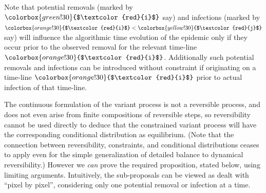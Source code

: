 \documentclass[]{article}
\newcommand{\target}{{\colorbox{green!30}{$\textcolor{red}{i}$}}}
\newcommand{\infectee}{{\colorbox{yellow!30}{$\textcolor{red}{j}$}}}
\newcommand{\infector}{{\colorbox{orange!30}{$\textcolor{red}{i}$}}}
\begin{document}
Note that potential removals (marked by \(\target\) say) and infections (marked by \(\infector<\infectee\) say)
will influence the algorithmic time evolution of the epidemic only if they occur prior to the observed removal for the 
relevant time-line \(\infector\). 
Additionally such potential removals and infections can be introduced without constraint if originating on a time-line \(\infector\) prior to actual infection of that time-line.

\medskip

The continuous formulation of the
variant process is not a reversible process,
and does not even arise from finite compositions 
of reversible steps, so 
reversibility cannot be used directly to deduce 
that the constrained
variant process will have the corresponding conditional distribution as equilibrium.
(Note that the connection between reversibility,
constraints, and conditional distributions
ceases to apply even for the simple generalization
of detailed balance to dynamical reversibility.)
However we \emph{can} prove the required proposition, stated below,
using limiting arguments.
Intuitively, the sub-proposals can be viewed as dealt with ``pixel by pixel'', 
considering only one potential
removal or infection at a time.
\end{document}
